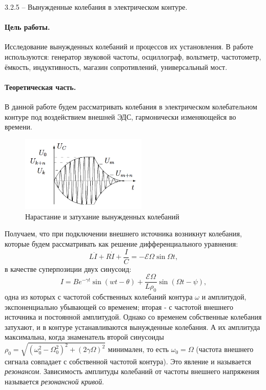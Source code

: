 \documentclass{../lab_class}
\newcommand{\ef}{\mathscr{E}}
\begin{document}
{\Large 3.2.5 --  Вынужденные колебания в электрическом контуре.}

\paragraph{Цель работы.}
Исследование вынужденных колебаний и процессов их установления.
В работе используются: генератор звуковой частоты, осциллограф, вольтметр, частотометр, ёмкость, индуктивность, магазин сопротивлений, универсальный мост.

\paragraph{Теоретическая часть.}
В данной работе будем рассматривать колебания в электрическом колебательном контуре под воздействием внешней ЭДС, гармонически изменяющейся во времени.
 
\begin{figure}
\centering
\includegraphics[width=6cm]{Fig3.png}
\caption{Нарастание и затухание вынужденных колебаний}
\end{figure}

Получаем, что при подключении внешнего источника возникнут колебания, которые будем рассматривать как решение дифференциального уравнения:
\begin{equation}
L\ddot{I} + R \dot{I} + \dfrac{I}{C} = - \ef \Omega \sin \Omega t,
\end{equation}
в качестве суперпозиции двух синусоид: 
\begin{equation}
I = Be^{-\gamma t} \sin (wt-\theta) + \dfrac{\ef \Omega}{L \rho_0} \sin (\Omega t - \psi),
\end{equation}
одна из которых с частотой собственных колебаний контура $\omega$ и амплитудой, экспоненциально убывающей со временем; вторая - с частотой внешнего источника и постоянной амплитудой. Однако со временем собственные колебания затухают, и в контуре устанавливаются вынужденные колебания. А их амплитуда максимальна, когда знаменатель второй синусоиды $\rho_0 = \sqrt{(\omega_0^2 - \Omega^2_0)^2 + (2\gamma \Omega)^2}$ минимален, то есть $\omega_0 = \Omega$ (частота внешнего сигнала совпадает с собственной частотой контура). Это явление и называется \textit{резонансом}. Зависимость амплитуды колебаний от частоты внешнего напряжения называется \textit{резонансной кривой}.
\end{document}
